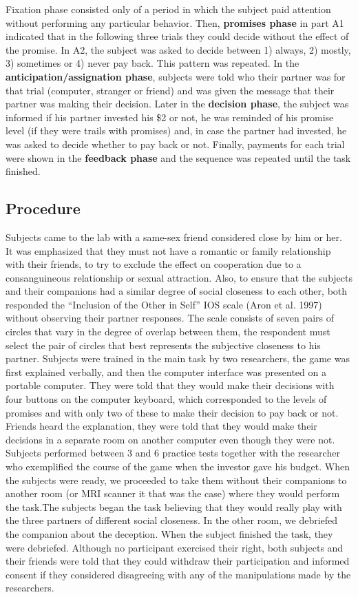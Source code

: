 \documentclass[smallextended]{svjour3}       %
\begin{document}
Fixation phase consisted only of a period in which the subject paid
attention without performing any particular behavior. Then,
\textbf{promises phase} in part A1 indicated that in the following three
trials they could decide without the effect of the promise. In A2, the
subject was asked to decide between 1) always, 2) mostly, 3) sometimes
or 4) never pay back. This pattern was repeated. In the
\textbf{anticipation/assignation phase}, subjects were told who their
partner was for that trial (computer, stranger or friend) and was given
the message that their partner was making their decision. Later in the
\textbf{decision phase}, the subject was informed if his partner
invested his \$2 or not, he was reminded of his promise level (if they
were trails with promises) and, in case the partner had invested, he was
asked to decide whether to pay back or not. Finally, payments for each
trial were shown in the \textbf{feedback phase} and the sequence was
repeated until the task finished.

\hypertarget{procedure}{%
\subsection{Procedure}\label{procedure}}

Subjects came to the lab with a same-sex friend considered close by him
or her. It was emphasized that they must not have a romantic or family
relationship with their friends, to try to exclude the effect on
cooperation due to a consanguineous relationship or sexual attraction.
Also, to ensure that the subjects and their companions had a similar
degree of social closeness to each other, both responded the ``Inclusion
of the Other in Self'' IOS scale (Aron et al. 1997) without observing
their partner responses. The scale consists of seven pairs of circles
that vary in the degree of overlap between them, the respondent must
select the pair of circles that best represents the subjective closeness
to his partner. Subjects were trained in the main task by two
researchers, the game was first explained verbally, and then the
computer interface was presented on a portable computer. They were told
that they would make their decisions with four buttons on the computer
keyboard, which corresponded to the levels of promises and with only two
of these to make their decision to pay back or not. Friends heard the
explanation, they were told that they would make their decisions in a
separate room on another computer even though they were not. Subjects
performed between 3 and 6 practice tests together with the researcher
who exemplified the course of the game when the investor gave his
budget. When the subjects were ready, we proceeded to take them without
their companions to another room (or MRI scanner it that was the case)
where they would perform the task.The subjects began the task believing
that they would really play with the three partners of different social
closeness. In the other room, we debriefed the companion about the
deception. When the subject finished the task, they were debriefed.
Although no participant exercised their right, both subjects and their
friends were told that they could withdraw their participation and
informed consent if they considered disagreeing with any of the
manipulations made by the researchers.
\end{document}
